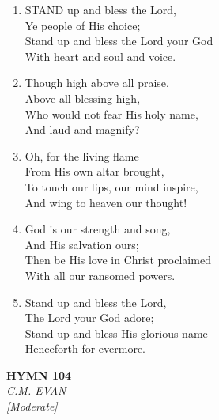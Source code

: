 \documentclass[11pt,a4paper]{article}
\begin{document}
\begin{enumerate}
    \item STAND up and bless the Lord, \\
        Ye people of His choice; \\
        Stand up and bless the Lord your God \\
        With heart and soul and voice.

    \item Though high above all praise, \\
        Above all blessing high, \\
        Who would not fear His holy name, \\
        And laud and magnify?

    \item Oh, for the living flame \\
        From His own altar brought, \\
        To touch our lips, our mind inspire, \\
        And wing to heaven our thought!

    \item God is our strength and song, \\
        And His salvation ours; \\
        Then be His love in Christ proclaimed \\
        With all our ransomed powers.

    \item Stand up and bless the Lord, \\
        The Lord your God adore; \\
        Stand up and bless His glorious name \\
        Henceforth for evermore.

\end{enumerate}

\newpage
\begin{center}
    {\Large \textbf{HYMN 104}}
    \\
    \textit{C.M. EVAN}
    \\
    \textit{\small [Moderate]}
\end{center}
\vspace{1em}
\end{document}
